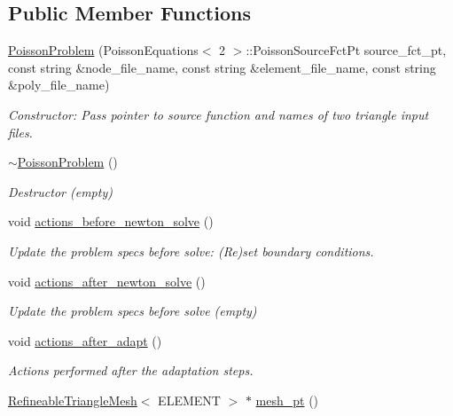 \subsection*{Public Member Functions}
\begin{DoxyCompactItemize}
\item 
\hyperlink{classPoissonProblem_a80765a4c029f9659b631a80c583b58cc}{Poisson\+Problem} (Poisson\+Equations$<$ 2 $>$\+::Poisson\+Source\+Fct\+Pt source\+\_\+fct\+\_\+pt, const string \&node\+\_\+file\+\_\+name, const string \&element\+\_\+file\+\_\+name, const string \&poly\+\_\+file\+\_\+name)
\begin{DoxyCompactList}\small\item\em Constructor\+: Pass pointer to source function and names of two triangle input files. \end{DoxyCompactList}\item 
\hyperlink{classPoissonProblem_ac247e42d2d292200617f4b9db7ed1ab8}{$\sim$\+Poisson\+Problem} ()
\begin{DoxyCompactList}\small\item\em Destructor (empty) \end{DoxyCompactList}\item 
void \hyperlink{classPoissonProblem_a398608a5ff73b74c5a387b3f794c58df}{actions\+\_\+before\+\_\+newton\+\_\+solve} ()
\begin{DoxyCompactList}\small\item\em Update the problem specs before solve\+: (Re)set boundary conditions. \end{DoxyCompactList}\item 
void \hyperlink{classPoissonProblem_a7a9478d8e1e5c7d3a886b00ab7d50bbd}{actions\+\_\+after\+\_\+newton\+\_\+solve} ()
\begin{DoxyCompactList}\small\item\em Update the problem specs before solve (empty) \end{DoxyCompactList}\item 
void \hyperlink{classPoissonProblem_ada7322b2e49e240033a2c3c974ddf0ca}{actions\+\_\+after\+\_\+adapt} ()
\begin{DoxyCompactList}\small\item\em Actions performed after the adaptation steps. \end{DoxyCompactList}\item 
\hyperlink{classoomph_1_1RefineableTriangleMesh}{Refineable\+Triangle\+Mesh}$<$ E\+L\+E\+M\+E\+NT $>$ $\ast$ \hyperlink{classPoissonProblem_aad9186546c682ff1aaae4fedc17e2c8c}{mesh\+\_\+pt} ()

\end{DoxyCompactItemize}
